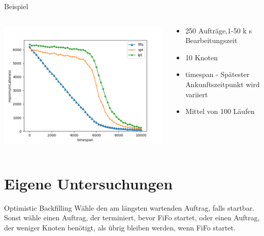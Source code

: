 \documentclass[aspectratio=169,10pt]{beamer}
\begin{document}
\begin{frame}[fragile]{Beispiel}

\begin{columns}
	\begin{column}{0.57\paperwidth}
		\vspace{0.5pt}
		\includegraphics[width=\linewidth, clip]{images/Figure_2_2}
	\end{column}
	\begin{column}[c]{0.43\paperwidth}
		\begin{itemize}
			\item 250 Auftr\"age,1-50 k s Bearbeitungszeit
			\item 10 Knoten
			\item timespan - Sp\"atester Ankunftszeitpunkt wird variiert
			\item Mittel von 100 L\"aufen
		\end{itemize}
	\end{column}
\end{columns}
\end{frame}

\section{Eigene Untersuchungen}

\begin{frame}[t,fragile]{Optimistic Backfilling}
	W\"ahle den am l\"angsten wartenden Auftrag, falls startbar. Sonst w\"ahle einen Auftrag, der terminiert, bevor FiFo startet, oder einen Auftrag, der weniger Knoten ben\"otigt, als \"ubrig bleiben werden, wenn FiFo startet.
\end{frame}
\end{document}
